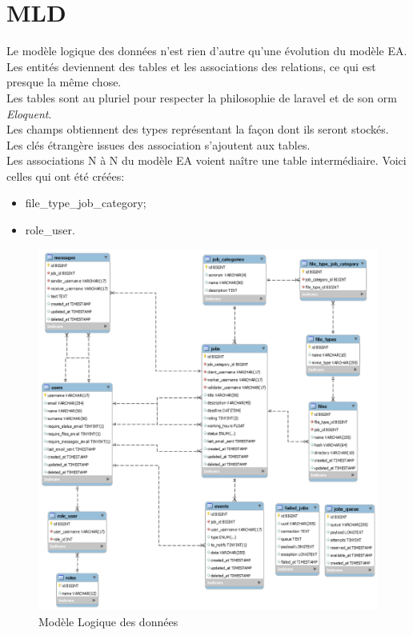 \documentclass[
    iai, %
    il, %
]{heig-tb}
\begin{document}
\newpage

\section{MLD}
Le modèle logique des données n'est rien d'autre qu'une évolution du modèle EA.\\
Les entités deviennent des tables et les associations des relations, ce qui est presque la même chose.\\
Les tables sont au pluriel pour respecter la philosophie de \Gls{laravel} et de son \Gls{orm} \emph{Eloquent}.\\
Les champs obtiennent des types représentant la façon dont ils seront stockés.\\
Les clés étrangère issues des association s'ajoutent aux tables.\\
Les associations N à N du modèle EA voient naître une table intermédiaire. Voici celles qui ont été créées:
\begin{itemize}
    \item file\_type\_job\_category;
    \item role\_user.
\end{itemize}

\begin{center}
    \begin{figure}[H]
        \includegraphics[width=\textwidth]{./assets/figures/mld.png}
        \caption{Modèle Logique des données \label{mld}}
    \end{figure}
\end{center}
\end{document}
